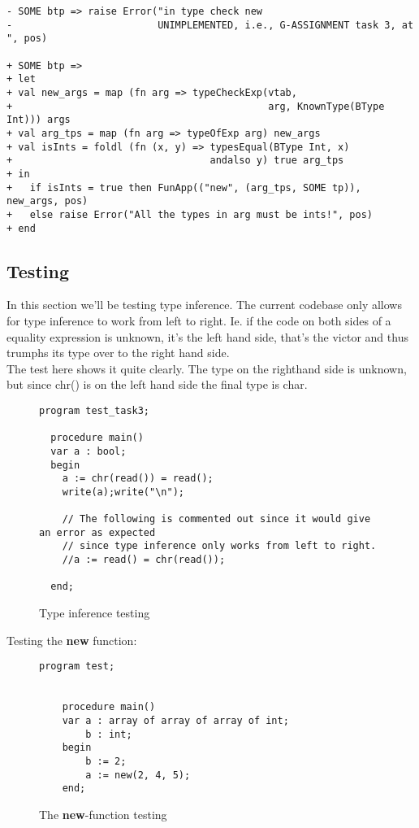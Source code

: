 \begin{lstlisting}[style=MLStyle]
- SOME btp => raise Error("in type check new 
-                         UNIMPLEMENTED, i.e., G-ASSIGNMENT task 3, at ", pos)

+ SOME btp => 
+ let
+ val new_args = map (fn arg => typeCheckExp(vtab,
+                                            arg, KnownType(BType Int))) args
+ val arg_tps = map (fn arg => typeOfExp arg) new_args
+ val isInts = foldl (fn (x, y) => typesEqual(BType Int, x) 
+                                  andalso y) true arg_tps 
+ in
+   if isInts = true then FunApp(("new", (arg_tps, SOME tp)), new_args, pos)
+   else raise Error("All the types in arg must be ints!", pos)
+ end
\end{lstlisting}
\subsection{Testing}
In this section we'll be testing type inference. The current codebase only
allows for type inference to work from left to right. Ie. if the code on both
sides of a equality expression is unknown, it's the left hand side, that's the
victor and thus trumphs its type over to the right hand side.\\
The test here shows it quite clearly. The type on the righthand side is unknown,
but since chr() is on the left hand side the final type is char.
\begin{figure}[H]
  \begin{lstlisting}[style=paladim]
  program test_task3;
  
  procedure main()
  var a : bool;
  begin
    a := chr(read()) = read();
    write(a);write("\n");
  
    // The following is commented out since it would give an error as expected
    // since type inference only works from left to right.
    //a := read() = chr(read());
  
  end;
  \end{lstlisting}
\caption{Type inference testing}
\end{figure}

\noindent
Testing the \textbf{new} function:
\begin{figure}[H]
  \begin{lstlisting}[style=paladim]
    program test;
    
    
    procedure main()
    var a : array of array of array of int;
        b : int;
    begin 
        b := 2;
        a := new(2, 4, 5);
    end;
  \end{lstlisting}
\caption{The \textbf{new}-function testing}
\end{figure}
